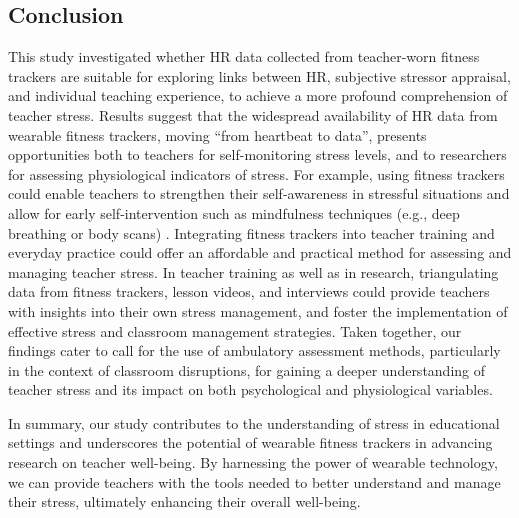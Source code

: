 \documentclass[preprint, 3p,
sort,]{elsarticle} %
\begin{document}
\subsection{Conclusion}\label{conclusion}

This study investigated whether HR data collected from teacher-worn
fitness trackers are suitable for exploring links between HR, subjective
stressor appraisal, and individual teaching experience, to achieve a
more profound comprehension of teacher stress. Results suggest that the
widespread availability of HR data from wearable fitness trackers,
moving ``from heartbeat to data'', presents opportunities both to
teachers for self-monitoring stress levels, and to researchers for
assessing physiological indicators of stress. For example, using fitness
trackers could enable teachers to strengthen their self-awareness in
stressful situations and allow for early self-intervention such as
mindfulness techniques (e.g., deep breathing or body scans)
\citep{agyapong2023interventions}. Integrating fitness trackers into
teacher training and everyday practice could offer an affordable and
practical method for assessing and managing teacher stress. In teacher
training as well as in research, triangulating data from fitness
trackers, lesson videos, and interviews could provide teachers with
insights into their own stress management, and foster the implementation
of effective stress and classroom management strategies. Taken together,
our findings cater to \citet{wettstein2021} call for the use of
ambulatory assessment methods, particularly in the context of classroom
disruptions, for gaining a deeper understanding of teacher stress and
its impact on both psychological and physiological variables.

In summary, our study contributes to the understanding of stress in
educational settings and underscores the potential of wearable fitness
trackers in advancing research on teacher well-being. By harnessing the
power of wearable technology, we can provide teachers with the tools
needed to better understand and manage their stress, ultimately
enhancing their overall well-being.


\end{document}
